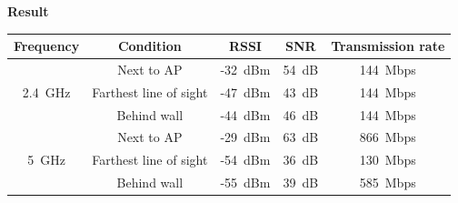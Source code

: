 \documentclass[12pt, a4paper]{article}
\begin{document}
  \noindent\textbf{Result}
  \begin{table}[H]
    \begin{tabular}{|ccccc|}
      \hline
      \textbf{Frequency} & \textbf{Condition} & \textbf{RSSI} &
      \textbf{SNR} & \textbf{Transmission rate} \\\hline
      \multirow{3}{*}{2.4~GHz} &
        Next to AP             & -32~dBm & 54~dB & 144~Mbps \\
      & Farthest line of sight & -47~dBm & 43~dB & 144~Mbps \\
      & Behind wall            & -44~dBm & 46~dB & 144~Mbps \\\hline
      \multirow{3}{*}{5~GHz} &
        Next to AP             & -29~dBm & 63~dB & 866~Mbps \\
      & Farthest line of sight & -54~dBm & 36~dB & 130~Mbps \\
      & Behind wall            & -55~dBm & 39~dB & 585~Mbps \\\hline
    \end{tabular}
  \end{table}
\end{document}
